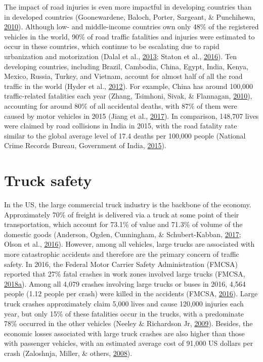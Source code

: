\documentclass[12pt]{book}
\numberwithin{equation}{chapter}
\begin{document}
The impact of road injuries is even more impactful in developing countries than in developed countries (Goonewardene, Baloch, Porter, Sargeant, \& Punchihewa, \protect\hyperlink{ref-goonewardene2010road}{2010}).
Although low- and middle-income countries own only 48\% of the registered vehicles in the world, 90\% of road traffic fatalities and injuries were estimated to occur in these countries, which continue to be escalating due to rapid urbanization and motorization (Dalal et al., \protect\hyperlink{ref-dalal2013economics}{2013}; Staton et al., \protect\hyperlink{ref-staton2016road}{2016}).
Ten developing countries, including Brazil, Cambodia, China, Egypt, India, Kenya, Mexico, Russia, Turkey, and Vietnam, account for almost half of all the road traffic in the world (Hyder et al., \protect\hyperlink{ref-hyder2012addressing}{2012}).
For example, China has around 100,000 traffic-related fatalities each year (Zhang, Tsimhoni, Sivak, \& Flannagan, \protect\hyperlink{ref-zhang2010road}{2010}), accounting for around 80\% of all accidental deaths, with 87\% of them were caused by motor vehicles in 2015 (Jiang et al., \protect\hyperlink{ref-jiang2017transport}{2017}).
In comparison, 148,707 lives were claimed by road collisions in India in 2015, with the road fatality rate similar to the global average level of 17.4 deaths per 100,000 people (National Crime Records Bureau, Government of India, \protect\hyperlink{ref-india2015}{2015}).

\hypertarget{truck-safety}{%
\section{Truck safety}\label{truck-safety}}

In the US, the large commercial truck industry is the backbone of the economy. Approximately 70\% of freight is delivered via a truck at some point of their transportation, which account for 73.1\% of value and 71.3\% of volume of the domestic goods (Anderson, Ogden, Cunningham, \& Schubert-Kabban, \protect\hyperlink{ref-anderson2017exploratory}{2017}; Olson et al., \protect\hyperlink{ref-olson2016weight}{2016}).
However, among all vehicles, large trucks are associated with more catastrophic accidents and therefore are the primary concern of traffic safety. In 2016, the Federal Motor Carrier Safety Administration (FMCSA) reported that 27\% fatal crashes in work zones involved large trucks (FMCSA, \protect\hyperlink{ref-fmcsareport2016}{2018}\protect\hyperlink{ref-fmcsareport2016}{a}). Among all 4,079 crashes involving large trucks or buses in 2016, 4,564 people (1.12 people per crash) were killed in the accidents (FMCSA, \protect\hyperlink{ref-fmcsafacts2016}{2016}). Large truck crashes approximately claim 5,000 lives and cause 120,000 injuries each year, but only 15\% of these fatalities occur in the trucks, with a predominate 78\% occurred in the other vehicles (Neeley \& Richardson Jr, \protect\hyperlink{ref-neeley2009effect}{2009}). Besides, the economic losses associated with large truck crashes are also higher than those with passenger vehicles, with an estimated average cost of 91,000 US dollars per crash (Zaloshnja, Miller, \& others, \protect\hyperlink{ref-zaloshnja2008unit}{2008}).
\end{document}
